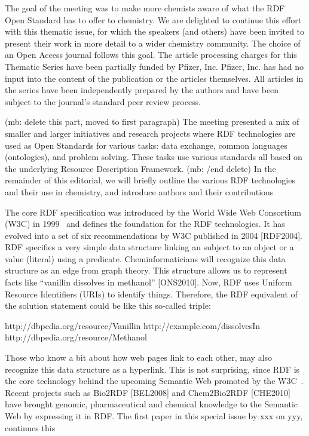 \documentclass[10pt]{bmc_article}
\newenvironment{bmcformat}{\begin{raggedright}\baselineskip20pt\sloppy\setboolean{publ}{false}}{\end{raggedright}\baselineskip20pt\sloppy}
\begin{document}
\begin{bmcformat}
The goal of the meeting was to make more chemists aware of what the RDF Open
Standard has to offer to chemistry. We are delighted to continue this effort
with this thematic issue, for which the speakers (and others) have been invited
to present their work in more detail to a wider chemistry community. The choice
of an Open Access journal follows this goal. The article processing charges for
this Thematic Series have been partially funded by Pfizer, Inc.  Pfizer, Inc.
has had no input into the content of the publication or the articles themselves.
 All articles in the series have been independently prepared by the authors and
have been subject to the journal's standard peer review process.

(mb: delete this part, moved to first paragraph) The meeting presented a mix of
smaller and larger initiatives and research projects where RDF technologies are
used as Open Standards for various tasks: data exchange, common languages
(ontologies), and problem solving. These tasks use various standards all based
on the underlying Resource Description Framework. (mb: /end delete)  In the
remainder of this editorial, we will briefly outline the various RDF
technologies and their use in chemistry, and introduce authors and their
contributions  

The core RDF specification was introduced by the World Wide Web Consortium (W3C)
in 1999~\cite{RDF1999} and defines the foundation for the RDF technologies. It has
evolved into a set of six recommendations by W3C published in 2004 [RDF2004]. 
RDF specifies a very simple data structure linking an subject to an object or a
value (literal) using a predicate. Cheminformaticians will recognize this data
structure as an edge from graph theory. This structure allows us to represent
facts like “vanillin dissolves in methanol” [ONS2010]. Now, RDF uses Uniform
Resource Identifiers (URIs) to identify things. Therefore, the RDF equivalent of
the solution statement could be like this so-called triple:

http://dbpedia.org/resource/Vanillin http://example.com/dissolvesIn http://dbpedia.org/resource/Methanol

Those who know a bit about how web pages link to each other, may also recognize
this data structure as a hyperlink. This is not surprising, since RDF is the
core technology behind the upcoming Semantic Web promoted by the
W3C~\cite{BER2001}. Recent projects such as Bio2RDF [BEL2008] and Chem2Bio2RDF
[CHE2010] have brought genomic, pharmaceutical and chemical knowledge to the
Semantic Web by expressing it in RDF. The first paper in this special issue by
xxx on yyy, continues this 


\end{bmcformat}
\end{document}
